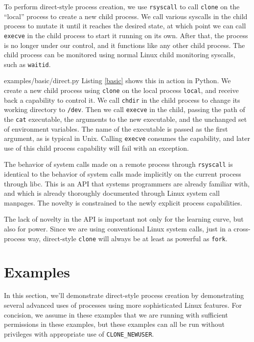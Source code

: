 \documentclass[letterpaper,twocolumn,10pt]{article}
\begin{document}
To perform direct-style process creation,
we use \texttt{rsyscall} to call \texttt{clone} on the ``local'' process to create a new child process.
We call various syscalls in the child process to mutate it until it reaches the desired state,
at which point we can call \texttt{execve} in the child process to start it running on its own.
After that, the process is no longer under our control, and it functions like any other child process.
The child process can be monitored using normal Linux child monitoring syscalls,
such as \texttt{waitid}.


{examples/basic/direct.py}
Listing \ref{basic} shows this in action in Python.
We create a new child process using \texttt{clone} on the local process \verb|local|,
and receive back a capability to control it.
We call \texttt{chdir} in the child process to change its working directory to \texttt{/dev}.
Then we call \texttt{execve} in the child,
passing the path of the \texttt{cat} executable,
the arguments to the new executable,
and the unchanged set of environment variables.
The name of the executable is passed as the first argument,
as is typical in Unix.
Calling \texttt{execve} consumes the capability,
and later use of this child process capability will fail with an exception.

The behavior of system calls made on a remote process through \texttt{rsyscall}
is identical to the behavior of system calls made implicitly on the current process through libc.
This is an API that systems programmers are already familiar with,
and which is already thoroughly documented through Linux system call manpages.
The novelty is constrained to the newly explicit process capabilities.

The lack of novelty in the API is important not only for the learning curve,
but also for power.
Since we are using conventional Linux system calls,
just in a cross-process way,
direct-style \texttt{clone} will always be at least as powerful as \texttt{fork}.
\section{Examples}\label{examples}
In this section,
we'll demonstrate direct-style process creation
by demonstrating several advanced uses of processes
using more sophisticated Linux features.
For concision, we assume in these examples that we are running with sufficient permissions in these examples,
but these examples can all be run without privileges with appropriate use of \verb|CLONE_NEWUSER|.
\end{document}
